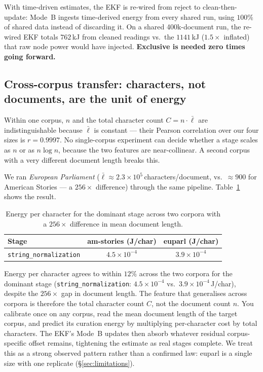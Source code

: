 \documentclass{article}
\begin{document}
With time-driven estimates, the EKF is re-wired from reject to clean-then-update: Mode~B ingests time-derived energy from every shared run, using $100\%$ of shared data instead of discarding it. On a shared 400k-document run, the re-wired EKF totals $762$\,kJ from cleaned readings vs.\ the $1141$\,kJ ($1.5\times$ inflated) that raw node power would have injected. \textbf{Exclusive is needed zero times going forward.}

\subsection{Cross-corpus transfer: characters, not documents, are the unit of energy}

\label{sec:results-chars}

Within one corpus, $n$ and the total character count $C = n \cdot \bar{\ell}$ are indistinguishable because $\bar{\ell}$ is constant --- their Pearson correlation over our four sizes is $r = 0.9997$. No single-corpus experiment can decide whether a stage scales as $n$ or as $n \log n$, because the two features are near-collinear. A second corpus with a very different document length breaks this.

We ran \emph{European Parliament} ($\bar{\ell} \approx 2.3{\times}10^5$\,characters/document, vs.\ ${\approx}900$ for American Stories --- a $256\times$ difference) through the same pipeline. Table~\ref{tab:chars} shows the result.

\begin{table}[ht]
  \centering
  \begin{tabular}{lcc}
    \toprule
    Stage & am-stories (J/char) & euparl (J/char) \\
    \midrule
    \texttt{string\_normalization} & $4.5{\times}10^{-4}$ & $3.9{\times}10^{-4}$ \\
    \bottomrule
  \end{tabular}
  \caption{Energy per character for the dominant stage across two corpora with a $256\times$ difference in mean document length.}
  \label{tab:chars}
\end{table}

Energy per character agrees to within $12\%$ across the two corpora for the dominant stage (\texttt{string\_normalization}: $4.5{\times}10^{-4}$ vs.\ $3.9{\times}10^{-4}$\,J/char), despite the $256\times$ gap in document length. The feature that generalises across corpora is therefore the total character count $C$, not the document count $n$. You calibrate once on any corpus, read the mean document length of the target corpus, and predict its curation energy by multiplying per-character cost by total characters. The EKF's Mode~B updates then absorb whatever residual corpus-specific offset remains, tightening the estimate as real stages complete. We treat this as a strong observed pattern rather than a confirmed law: euparl is a single size with one replicate (\S\ref{sec:limitations}).
\end{document}
